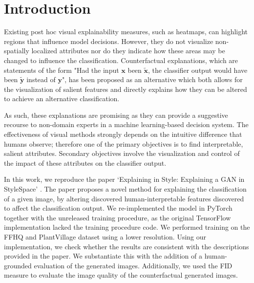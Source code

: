 \section{Introduction}

\begin{comment}
In recent years, many machine learning algorithms have been designed to be black-box algorithms -- systems where everything is known about the inputs and the outputs, but little about the internal logic to the user. The lack of explanation introduces both a practical and an ethical issue and has hindered the large-scale deployment of these models \cite{guidotti2018survey}.
\end{comment}

Existing post hoc visual explainability measures, such as heatmaps\cite{8237336}, can highlight regions that influence model decisions. However, they do not visualize non-spatially localized attributes nor do they indicate how these areas may be changed to influence the classification. Counterfactual explanations, which are statements of the form "Had the input $\mathbf{x}$ been $\mathbf{\tilde{x}}$, the classifier output would have been $\mathbf{\tilde{y}}$ instead of $\mathbf{y}$", has been proposed as an alternative which both allows for the visualization of salient features and directly explains how they can be altered to achieve an alternative classification.

As such, these explanations are promising as they can provide a suggestive recourse to non-domain experts in a machine learning-based decision system. The effectiveness of visual methods strongly depends on the intuitive difference that humans observe; therefore one of the primary objectives is to find interpretable, salient attributes. Secondary objectives involve the visualization and control of the impact of these attributes on the classifier output.

In this work, we reproduce the paper ‘Explaining in Style: Explaining a GAN in StyleSpace’ \cite{explaining_in_style}. The paper proposes a novel method for explaining the classification of a given image, by altering discovered human-interpretable features discovered to affect the classification output. We re-implemented the model in PyTorch together with the unreleased training procedure, as the original TensorFlow implementation lacked the training procedure code. We performed training on the FFHQ and PlantVillage dataset using a lower resolution. Using our implementation, we check whether the results are consistent with the descriptions provided in the paper. We substantiate this with the addition of a human-grounded evaluation of the generated images. Additionally, we used the FID measure to evaluate the image quality of the counterfactual generated images.


